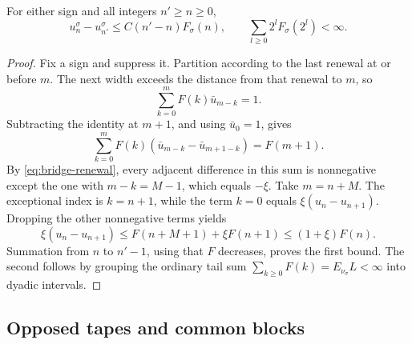 \begin{lemma}
\label{lem:width-tail}
For either sign and all integers $n'\ge n\ge0$,
\begin{equation}
 u_n^\sigma-u_{n'}^\sigma
   \le C(n'-n)F_\sigma(n),
 \qquad
 \sum_{l\ge0}2^lF_\sigma(2^l)<\infty.
 \label{eq:width-tail-comparison}
\end{equation}
\end{lemma}

\begin{proof}
Fix a sign and suppress it. Partition according to the last renewal at
or before $m$. The next width exceeds the distance from that renewal to
$m$, so
\[
 \sum_{k=0}^m F(k)\bar u_{m-k}=1.
\]
Subtracting the identity at $m+1$, and using $\bar u_0=1$, gives
\[
 \sum_{k=0}^m F(k)
       (\bar u_{m-k}-\bar u_{m+1-k})=F(m+1).
\]
By \eqref{eq:bridge-renewal}, every adjacent difference in this sum is
nonnegative except the one with $m-k=M-1$, which equals $-\xi$.
Take $m=n+M$. The exceptional index is $k=n+1$, while the term $k=0$
equals $\xi(u_n-u_{n+1})$. Dropping the other nonnegative terms yields
\[
 \xi(u_n-u_{n+1})
   \le F(n+M+1)+\xi F(n+1)
   \le(1+\xi)F(n).
\]
Summation from $n$ to $n'-1$, using that $F$ decreases, proves the first
bound. The second follows by grouping the ordinary tail sum
$\sum_{k\ge0}F(k)=E_{\nu_\sigma}L<\infty$ into dyadic intervals.
\end{proof}

\subsection{Opposed tapes and common blocks}

